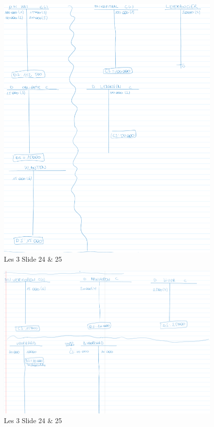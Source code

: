 \documentclass[10pt,a4paper]{report}
\begin{document}
\begin{figure}[h!]
\centering
\includegraphics[width=120mm]{Les03_04.png}
\caption{Les 3 Slide 24 $\&$ 25} 
\label{les03_04}
\end{figure}

\begin{figure}[h!]
\centering
\includegraphics[width=120mm]{Les03_05.png}
\caption{Les 3 Slide 24 $\&$ 25} 
\label{les03_05}
\end{figure}
\end{document}
